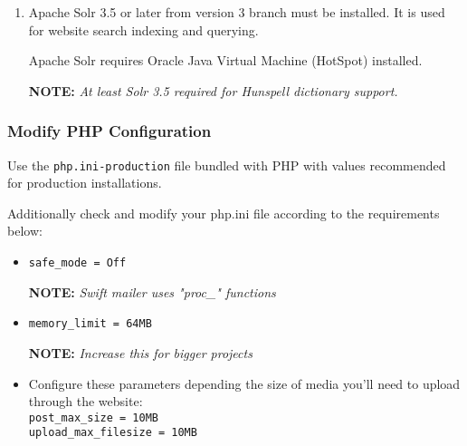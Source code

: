 \documentclass[12pt]{article}
\newcommand{\vigShowNotes}{1}
\newcommand{\note}[1]{
\textbf{NOTE:} 
\textit{#1}
}
\begin{document}
\begin{enumerate}
Recommended PHP extensions:
\begin{itemize}
	\item  \texttt{apc}
\end{itemize}

\note{Most popular extra extensions we forget to add are \texttt{zip} (PHPExcel), \texttt{shmop} (GeoIP), \texttt{soap}, \texttt{ldap}.}

\note{PHP 5.3.3 required because "As of PHP 5.3.3, methods with the same name as the last element of a namespaced class name will no longer be treated as constructor. This change doesn't affect non-namespaced classes.". Some Supra classes might have methods with name equal to classname without intention to work as constructor.}
	
\note{At least 5.3.6 is recommended for correct Mysql charset support on connection options without "SET NAMES" initial request.}

\item
Apache Solr 3.5 or later from version 3 branch must be installed. It is used for website search indexing and querying.

Apache Solr requires Oracle Java Virtual Machine (HotSpot) installed.

\note{At least Solr 3.5 required for Hunspell dictionary support.}

\end{enumerate}

\subsubsection{Modify PHP Configuration}

Use the \texttt{php.ini-production} file bundled with PHP with values recommended for production installations.

Additionally check and modify your php.ini file according to the requirements below:

\begin{itemize}
	\item \texttt{safe\_mode = Off}
	
	\note{Swift mailer uses "proc\_\*" functions}
	
	\item \texttt{memory\_limit = 64MB}
	
	\note{Increase this for bigger projects}
	
	\item Configure these parameters depending the size of media you'll need to upload through the website:
	\\ \texttt{post\_max\_size = 10MB}
	\\ \texttt{upload\_max\_filesize = 10MB}
	
\end{itemize}
\end{document}
